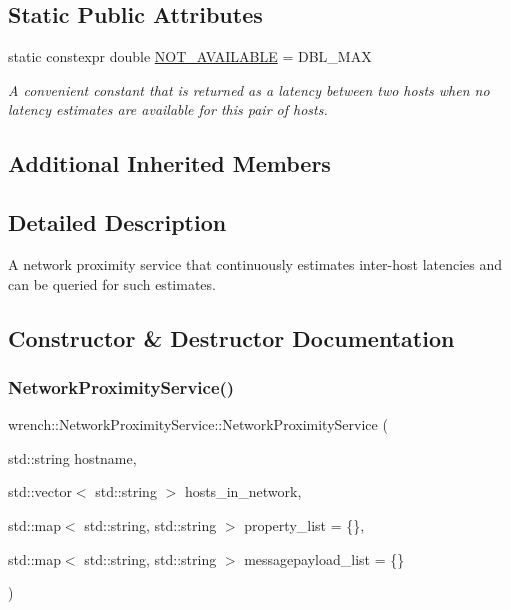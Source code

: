 \subsection*{Static Public Attributes}
\begin{DoxyCompactItemize}
\item 
\mbox{\label{classwrench_1_1_network_proximity_service_a80fbe67338515e3277becf635af22534}} 
static constexpr double \hyperlink{classwrench_1_1_network_proximity_service_a80fbe67338515e3277becf635af22534}{N\+O\+T\+\_\+\+A\+V\+A\+I\+L\+A\+B\+LE} = D\+B\+L\+\_\+\+M\+AX
\begin{DoxyCompactList}\small\item\em A convenient constant that is returned as a latency between two hosts when no latency estimates are available for this pair of hosts. \end{DoxyCompactList}\end{DoxyCompactItemize}
\subsection*{Additional Inherited Members}


\subsection{Detailed Description}
A network proximity service that continuously estimates inter-\/host latencies and can be queried for such estimates. 

\subsection{Constructor \& Destructor Documentation}
\mbox{\label{classwrench_1_1_network_proximity_service_a8f7021f0fd9a5a6393fc447652c2371b}} 
\subsubsection{\texorpdfstring{Network\+Proximity\+Service()}{NetworkProximityService()}}
{\footnotesize\ttfamily wrench\+::\+Network\+Proximity\+Service\+::\+Network\+Proximity\+Service (\begin{DoxyParamCaption}\item[{std\+::string}]{hostname,  }\item[{std\+::vector$<$ std\+::string $>$}]{hosts\+\_\+in\+\_\+network,  }\item[{std\+::map$<$ std\+::string, std\+::string $>$}]{property\+\_\+list = {\ttfamily \{\}},  }\item[{std\+::map$<$ std\+::string, std\+::string $>$}]{messagepayload\+\_\+list = {\ttfamily \{\}} }\end{DoxyParamCaption})}



